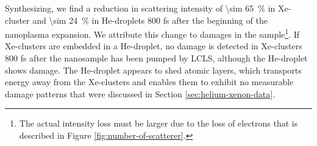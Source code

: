 %
Synthesizing, we find a reduction in scattering intensity of \SI{\sim 65}{\percent} in Xe-cluster and \SI{\sim 24}{\percent} in He-droplets 800 fs after the beginning of the nanoplasma expansion. We attribute this change to damages in the sample\footnote{The actual intensity loss must be larger due to the loss of electrons that is described in Figure \ref{fig:number-of-scatterer}.}. If Xe-clusters are embedded in a He-droplet, no damage is detected in Xe-clusters 800 fs after the nanosample has been pumped by LCLS, although the He-droplet shows damage. The He-droplet appears to shed atomic layers, which transports energy away from the Xe-clusters and enables them to exhibit no measurable damage patterns that were discussed in Section \ref{sec:helium-xenon-data}.
%
%
%
%
%
%
%
%
%
%
%
%
%
%
%
